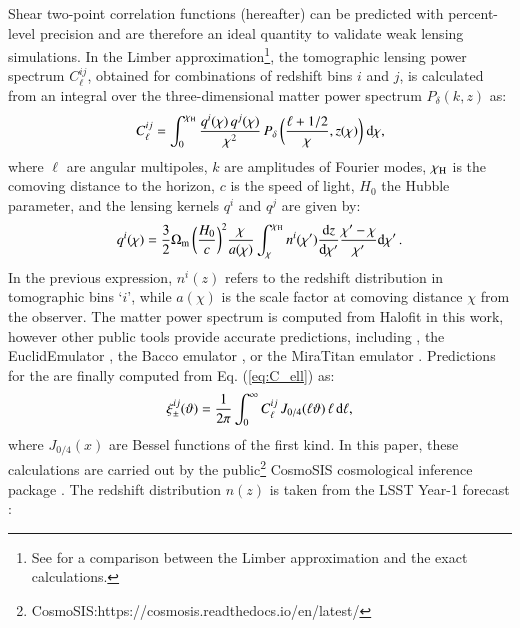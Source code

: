 Shear two-point correlation functions (\gtwopcf hereafter) can be predicted with percent-level precision and are therefore an ideal quantity to validate weak lensing simulations.
In the Limber approximation\footnote{See \citet{Kilbinger17} for a comparison between the Limber approximation and the exact calculations.}, the tomographic lensing power spectrum $C^{ij}_{\ell}$, obtained for combinations of redshift bins $i$ and $j$, is calculated from an integral over the three-dimensional matter power spectrum $P_{\delta}(k, z)$ as:
  \begin{eqnarray}
C_{\ell}^{ij} = \int_0^{\chi_{\rm H}}  \frac{q^i(\chi) \,q^j(\chi)}{\chi^2} \, P_{\delta}\, \bigg(\frac{\ell+1/2}{\chi},z(\chi)\bigg) \ {\rm d}\chi,
\label{eq:C_ell}
\end{eqnarray}
where $\ell$ are angular multipoles, $k$ are amplitudes of Fourier modes, $\chi_{\rm H}$ is the comoving distance to the horizon, $c$ is the speed of light, $H_0$ the Hubble parameter, and the lensing kernels $q^{i}$ and $q^j$ are given by:
\begin{eqnarray}
q^{i}(\chi) = \frac{3}{2}\Omega_{\rm m} \, \bigg(\frac{H_0}{c} \bigg)^2 \frac{\chi}{a(\chi)} \int_{\chi}^{\chi_{\rm H}} n^i(\chi')\frac{{\rm d}z}{{\rm d} \chi'}\frac{\chi' - \chi}{\chi'}{\rm d}\chi' \, .
\label{eq:q_lensing}
\end{eqnarray}
In the previous expression, $n^i(z)$ refers to the redshift distribution  in tomographic bins `$i$', while $a(\chi)$ is the scale factor at comoving distance $\chi$ from the observer.
The matter power spectrum is computed from  {\sc Halofit} \citep{Takahashi2012} in this work, however other public tools provide accurate predictions, including  \citep{HMCode2020}, the {\sc EuclidEmulator} \citep{EuclidEmulator}, the {\sc Bacco} emulator \citep{BACCOEmulator}, or the {\sc MiraTitan} emulator \citep{miraTitan}. 
Predictions for the \gtwopcf are finally computed from Eq. (\ref{eq:C_ell}) as:
\begin{eqnarray}
\xi_{\pm}^{ij}(\vartheta) = \frac{1}{2\pi} \int_0^{\infty} C_{\ell}^{ij} \, J_{0/4}(\ell \vartheta) \, \ell \, {\rm d}\ell,
\label{eq:xipm_th}
\end{eqnarray}
where $J_{0/4}(x)$ are Bessel functions of the first kind. 
In this paper, these calculations are carried out by the public\footnote{{\sc CosmoSIS}:https://cosmosis.readthedocs.io/en/latest/ } {\sc CosmoSIS} cosmological inference package \citep{cosmoSIS}.
The redshift distribution $n (z)$ is taken from the LSST Year-1 forecast \citep{LSST-SRD}:

